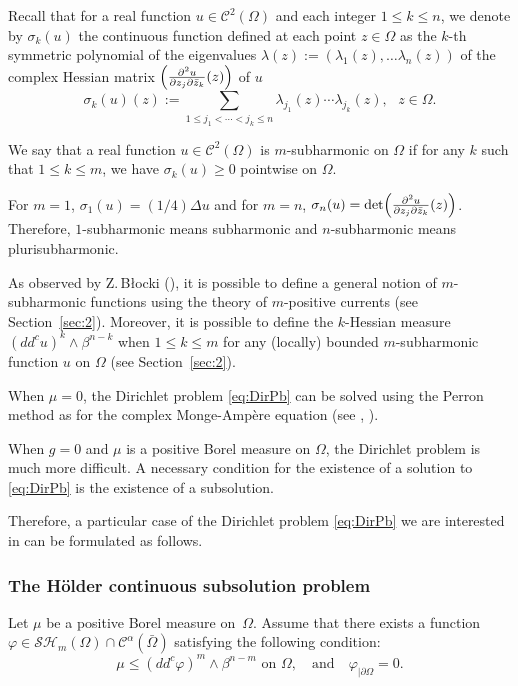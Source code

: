 \documentclass[JEP,XML,SOM,Unicode]{cedram}
\theoremstyle{definition}
\newcommand{\Cc}{\mathcal{C}}
\begin{document}
Recall that for a real function $u \in \Cc^2 (\Omega)$ and each integer $1 \leq k \leq n$, we denote by $\sigma_k (u)$ the continuous function defined at each point $z \in \Omega$ as the $k$-th symmetric polynomial of the eigenvalues $\lambda (z):= (\lambda_1 (z),\dots \lambda_n(z))$
of the complex Hessian matrix $\Bigl(\frac{\partial^2 u }{\partial z_j \partial \bar{z}_k} (z)\Bigr)$ of $u$ \ie
\[
\sigma_k (u) (z):= \sum_{1 \leq j_1 < \cdots < j_k \leq n} \lambda_{j_1} (z) \cdots \lambda_{j_k} (z), \, \, \, \, z \in \Omega.
\]

We say that a real function $u \in \Cc^2 (\Omega)$ is $m$-subharmonic on $\Omega$ if for any $k$ such that $1 \leq k \leq m$, we have $\sigma_k (u) \geq 0$ pointwise on $\Omega$.

For $m= 1$, $\sigma_1 (u) = (1 \slash 4) \Delta u$ and for $m = n$, $\sigma_n (u) = \det \Bigl(\frac{\partial^2 u }{\partial z_j \partial \bar{z}_k} (z)\Bigr)$.
Therefore, $1$-subharmonic means subharmonic and $n$-subharmonic means plurisubharmonic.

As observed by Z.\,B\l ocki (\cite{Bl05}), it is possible to define a general notion of $m$-subharmonic functions using the theory of $m$-positive currents (see Section~\ref{sec:2}). Moreover, it is possible to define the $k$-Hessian measure $(dd^c u)^k \wedge \beta^{n - k}$ when \hbox{$1 \leq k \leq m$} for any (locally) bounded $m$-subharmonic function $u$ on $\Omega$ (see Section~\ref{sec:2}).

When $\mu = 0$, the Dirichlet problem \eqref{eq:DirPb} can be solved using the Perron method as for the complex Monge-Ampère equation (see \cite{Bl05}, \cite{Ch16a}).

When $g = 0$ and $\mu$ is a positive Borel measure on $\Omega$, the Dirichlet problem is much more difficult. A necessary condition for the existence of a solution to \eqref{eq:DirPb} is the existence of a subsolution.

Therefore, a particular case of the Dirichlet problem \eqref{eq:DirPb} we are interested in can be formulated as follows.

\subsubsection*{The Hölder continuous subsolution problem}
Let $\mu$ be a positive Borel measure on~$\Omega$. Assume that there exists a function $\varphi \in \mathcal{SH}_m (\Omega) \cap \Cc^{\alpha} (\bar{\Omega})$ satisfying the following condition:
\begin{equation} \label{eq:subsolution}
\mu \leq (dd^c \varphi)^m \wedge \beta^{n - m}\text{ on }\Omega, \quad \text{and}\quad \varphi_{\mid \partial \Omega} = 0.
\end{equation}
\end{document}
